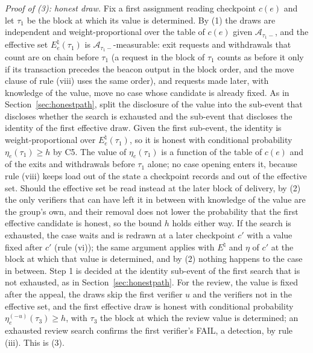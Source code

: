 \documentclass[10pt,a4paper]{article}
\newcommand{\cA}{\mathcal{A}}
\theoremstyle{plain}
\theoremstyle{remark}
\begin{document}
\emph{Proof of (3): honest draw.} Fix a first assignment reading checkpoint $c(e)$ and let $\tau_1$ be the block at which its value is determined. By (1) the draws are independent and weight-proportional over the table of $c(e)$ given $\cA_{\tau_1-}$, and the effective set $E_e^\natural(\tau_1)$ is $\cA_{\tau_1-}$-measurable: exit requests and withdrawals that count are on chain before $\tau_1$ (a request in the block of $\tau_1$ counts as before it only if its transaction precedes the beacon output in the block order, and the move clause of rule (viii) uses the same order), and requests made later, with knowledge of the value, move no case whose candidate is already fixed. As in Section~\ref{sec:honestpath}, split the disclosure of the value into the sub-event that discloses whether the search is exhausted and the sub-event that discloses the identity of the first effective draw. Given the first sub-event, the identity is weight-proportional over $E_e^\natural(\tau_1)$, so it is honest with conditional probability $\eta_e(\tau_1)\ge h$ by C5. The value of $\eta_e(\tau_1)$ is a function of the table of $c(e)$ and of the exits and withdrawals before $\tau_1$ alone; no case opening enters it, because rule (viii) keeps load out of the state a checkpoint records and out of the effective set. Should the effective set be read instead at the later block of delivery, by (2) the only verifiers that can have left it in between with knowledge of the value are the group's own, and their removal does not lower the probability that the first effective candidate is honest, so the bound $h$ holds either way. If the search is exhausted, the case waits and is redrawn at a later checkpoint $c'$ with a value fixed after $c'$ (rule (vi)); the same argument applies with $E^\natural$ and $\eta$ of $c'$ at the block at which that value is determined, and by (2) nothing happens to the case in between. Step 1 is decided at the identity sub-event of the first search that is not exhausted, as in Section~\ref{sec:honestpath}. For the review, the value is fixed after the appeal, the draws skip the first verifier $u$ and the verifiers not in the effective set, and the first effective draw is honest with conditional probability $\eta_e^{(-u)}(\tau_3)\ge h$, with $\tau_3$ the block at which the review value is determined; an exhausted review search confirms the first verifier's FAIL, a detection, by rule (iii). This is (3).
\end{document}
